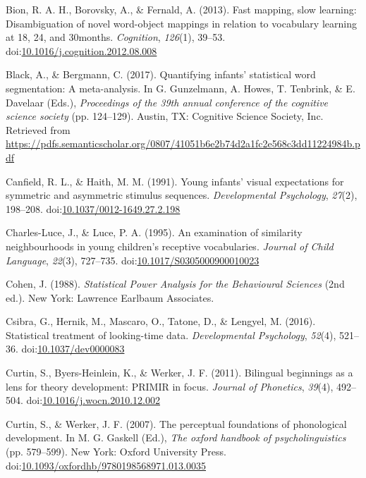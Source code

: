 \documentclass[man]{apa6}
\begin{document}
\leavevmode\hypertarget{ref-Bion2013}{}%
Bion, R. A. H., Borovsky, A., \& Fernald, A. (2013). Fast mapping, slow learning: Disambiguation of novel word-object mappings in relation to vocabulary learning at 18, 24, and 30months. \emph{Cognition}, \emph{126}(1), 39--53. doi:\href{https://doi.org/10.1016/j.cognition.2012.08.008}{10.1016/j.cognition.2012.08.008}

\leavevmode\hypertarget{ref-Black2017}{}%
Black, A., \& Bergmann, C. (2017). Quantifying infants' statistical word segmentation: A meta-analysis. In G. Gunzelmann, A. Howes, T. Tenbrink, \& E. Davelaar (Eds.), \emph{Proceedings of the 39th annual conference of the cognitive science society} (pp. 124--129). Austin, TX: Cognitive Science Society, Inc. Retrieved from \url{https://pdfs.semanticscholar.org/0807/41051b6e2b74d2a1fc2e568c3dd11224984b.pdf}

\leavevmode\hypertarget{ref-Canfield1991}{}%
Canfield, R. L., \& Haith, M. M. (1991). Young infants' visual expectations for symmetric and asymmetric stimulus sequences. \emph{Developmental Psychology}, \emph{27}(2), 198--208. doi:\href{https://doi.org/10.1037/0012-1649.27.2.198}{10.1037/0012-1649.27.2.198}

\leavevmode\hypertarget{ref-CharlesLuce1995}{}%
Charles-Luce, J., \& Luce, P. A. (1995). An examination of similarity neighbourhoods in young children's receptive vocabularies. \emph{Journal of Child Language}, \emph{22}(3), 727--735. doi:\href{https://doi.org/10.1017/S0305000900010023}{10.1017/S0305000900010023}

\leavevmode\hypertarget{ref-cohen}{}%
Cohen, J. (1988). \emph{Statistical Power Analysis for the Behavioural Sciences} (2nd ed.). New York: Lawrence Earlbaum Associates.

\leavevmode\hypertarget{ref-Csibra2016}{}%
Csibra, G., Hernik, M., Mascaro, O., Tatone, D., \& Lengyel, M. (2016). Statistical treatment of looking-time data. \emph{Developmental Psychology}, \emph{52}(4), 521--36. doi:\href{https://doi.org/10.1037/dev0000083}{10.1037/dev0000083}

\leavevmode\hypertarget{ref-Curtin2011}{}%
Curtin, S., Byers-Heinlein, K., \& Werker, J. F. (2011). Bilingual beginnings as a lens for theory development: PRIMIR in focus. \emph{Journal of Phonetics}, \emph{39}(4), 492--504. doi:\href{https://doi.org/10.1016/j.wocn.2010.12.002}{10.1016/j.wocn.2010.12.002}

\leavevmode\hypertarget{ref-Curtin2007}{}%
Curtin, S., \& Werker, J. F. (2007). The perceptual foundations of phonological development. In M. G. Gaskell (Ed.), \emph{The oxford handbook of psycholinguistics} (pp. 579--599). New York: Oxford University Press. doi:\href{https://doi.org/10.1093/oxfordhb/9780198568971.013.0035}{10.1093/oxfordhb/9780198568971.013.0035}
\end{document}
